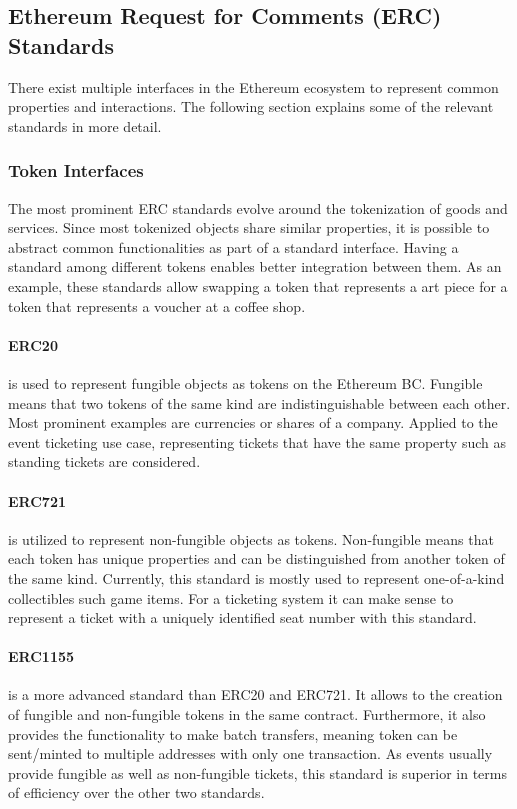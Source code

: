 \subsection{Ethereum Request for Comments (ERC) Standards}

There exist multiple interfaces in the Ethereum ecosystem to represent common properties and interactions. The following section explains some of the relevant standards in more detail. 

\subsubsection{Token Interfaces}\label{subsubsection:token-interfaces}

The most prominent ERC standards evolve around the tokenization of goods and services. Since most tokenized objects share similar properties, it is possible to abstract common functionalities as part of a standard interface. Having a standard among different tokens enables better integration between them. As an example, these standards allow swapping a token that represents a art piece for a token that represents a voucher at a coffee shop. 


\paragraph{ERC20} is used to represent fungible objects as tokens on the Ethereum BC. Fungible means that two tokens of the same kind are indistinguishable between each other. Most prominent examples are currencies or shares of a company. Applied to the event ticketing use case, representing tickets that have the same property such as standing tickets are considered.

\paragraph{ERC721} is utilized to represent non-fungible objects as tokens. Non-fungible means that each token has unique properties and can be distinguished from another token of the same kind. Currently, this standard is mostly used to represent one-of-a-kind collectibles such game items. For a ticketing system it can make sense to represent a ticket with a uniquely identified seat number with this standard. 

\paragraph{ERC1155} is a more advanced standard than ERC20 and ERC721. It allows to the creation of fungible and non-fungible tokens in the same contract. Furthermore, it also provides the functionality to make batch transfers, meaning token can be sent/minted to multiple addresses with only one transaction. As events usually provide fungible as well as non-fungible tickets, this standard is superior in terms of efficiency over the other two standards.

